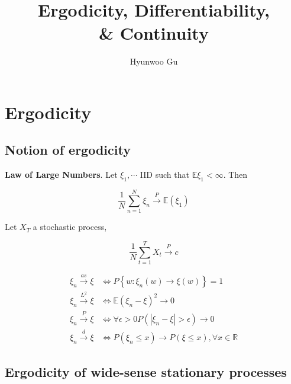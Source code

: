 \documentclass[12pt]{article}
\theoremstyle{nonumberbreak}
\begin{document}
\title{\textbf{Ergodicity, Differentiability, \\ \& Continuity}}
\author{Hyunwoo Gu}
\date{}

\maketitle


\section{Ergodicity}

\subsection{Notion of ergodicity}


\begin{theorem}
\textbf{Law of Large Numbers}. Let $\xi_1, \cdots $ IID such that $\mathbb{E} \xi_1 < \infty$. Then

$$
\frac{1}{N} \sum_{n=1}^N \xi_n \overset{P}{\to} \mathbb{E}(\xi_1)
$$

\end{theorem}

Let $X_T$ a stochastic process,

$$
\frac{1}{N} \sum_{t=1}^T X_t \overset{P}{\to} c
$$


$$
\begin{aligned}
\xi_n \overset{as}{\to} \xi &\Leftrightarrow P \left\{ w: \xi_n(w)  \to \xi(w) \right\} = 1 \\[8pt]
\xi_n \overset{L^2}{\to} \xi &\Leftrightarrow \mathbb{E}(\xi_n - \xi)^2 \to 0 \\[8pt]
\xi_n \overset{P}{\to} \xi &\Leftrightarrow \forall \epsilon >0 P(|\xi_n - \xi| > \epsilon) \to 0 \\[8pt]
\xi_n \overset{d}{\to} \xi &\Leftrightarrow P(\xi_n \le x) \to P(\xi \le x), \forall x \in \mathbb{R}
\end{aligned}
$$



\subsection{Ergodicity of wide-sense stationary processes}
\end{document}

